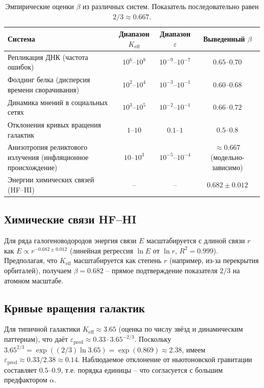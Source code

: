 \documentclass[12pt]{article}
\newcommand{\Keff}{K_{\mathrm{eff}}}
\newcommand{\eps}{\varepsilon}
\begin{document}
	\begin{table}[htbp]
		\centering
		\caption{Эмпирические оценки \(\beta\) из различных систем. Показатель последовательно равен \(2/3 \approx 0.667\).}
		\label{tab:data}
		\begin{tabular}{lccc}
			\toprule
			Система & Диапазон \(\Keff\) & Диапазон \(\eps\) & Выведенный \(\beta\) \\
			\midrule
			Репликация ДНК (частота ошибок) & \(10^6\)–\(10^8\) & \(10^{-9}\)–\(10^{-7}\) & \(0.65\)–\(0.70\) \\
			Фолдинг белка (дисперсия времени сворачивания) & \(10^2\)–\(10^4\) & \(10^{-3}\)–\(10^{-1}\) & \(0.60\)–\(0.68\) \\
			Динамика мнений в социальных сетях & \(10^3\)–\(10^5\) & \(10^{-2}\)–\(10^{-1}\) & \(0.66\)–\(0.72\) \\
			Отклонения кривых вращения галактик & \(1\)–\(10\) & \(0.1\)–\(1\) & \(0.5\)–\(0.8\) \\
			Анизотропия реликтового излучения (инфляционное происхождение) & \(10\)–\(10^3\) & \(10^{-5}\)–\(10^{-4}\) & \(\approx 0.667\) (модельно-зависимо) \\
			Энергии химических связей (HF–HI) & – & – & \(0.682 \pm 0.012\) \\
			\bottomrule
		\end{tabular}
	\end{table}
	
	\subsection*{Химические связи HF–HI}
	Для ряда галогеноводородов энергия связи \(E\) масштабируется с длиной связи \(r\) как \(E \propto r^{-0.682 \pm 0.012}\) (линейная регрессия \(\ln E\) от \(\ln r\), \(R^2 = 0.999\)). Предполагая, что \(\Keff\) масштабируется как степень \(r\) (например, из-за перекрытия орбиталей), получаем \(\beta = 0.682\) – прямое подтверждение показателя \(2/3\) на атомном масштабе.
	
	\subsection*{Кривые вращения галактик}
	Для типичной галактики \(\Keff \approx 3.65\) (оценка по числу звёзд и динамическим паттернам), что даёт \(\eps_{\text{pred}} \approx 0.33 \cdot 3.65^{-2/3}\). Поскольку \(3.65^{2/3} = \exp((2/3)\ln 3.65) = \exp(0.869) \approx 2.38\), имеем \(\eps_{\text{pred}} \approx 0.33/2.38 \approx 0.14\). Наблюдаемое отклонение от ньютоновской гравитации составляет \(0.5\)–\(0.9\), т.е. порядка единицы – что согласуется с большим предфактором \(\alpha\).
	
\end{document}
